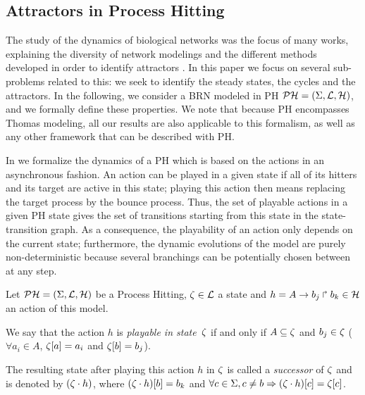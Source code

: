 \subsection{Attractors in Process Hitting}

The study of the dynamics of biological networks was the focus of many works, explaining the diversity of network modelings and the different methods developed in order to identify attractors \cite{skodawessely2011finding, zhang2007algorithms, mushthofa2014asp, akutsu2012finding, berntenis2013detection}.
In this paper we focus on several sub-problems related to this: we seek to identify the steady states, the cycles and the attractors. %
In the following, we consider a BRN modeled in PH $\mathcal{PH}=(\Sigma,\mathcal{L},\mathcal{H})$,
and we formally define these properties.
We note that because PH encompasses Thomas modeling, all our results are also applicable to this formalism, as well as any other framework that can be described with PH.

In  we formalize the dynamics of a PH which is based on the actions in an asynchronous fashion.
An action can be played in a given state if all of its hitters and its target are active in this state; playing this action then means replacing the target process by the bounce process.
Thus, the set of playable actions in a given PH state gives the set of transitions starting from this state in the state-transition graph.
As a consequence, the playability of an action only depends on the current state;
furthermore, the dynamic evolutions of the model are purely non-deterministic
because several branchings can be potentially chosen between at any step.

\begin{definition}
\label{def:playableAction}
Let $\mathcal{PH} = (\Sigma,\mathcal{L},\mathcal{H})$ be a Process Hitting, $\zeta \in \mathcal{L}$ a state and $h = A\rightarrow b_j\Rsh b_k \in \mathcal{H}$ an action of this model.

We say that the action $h$
is \emph{playable in state~$\zeta$} if and only if
$A \subseteq \zeta$ and $b_j \in \zeta$ (\ie $\forall a_i \in A$, ${\zeta[a]} = a_i$ and ${\zeta[b]}=b_j$).

The resulting state after playing this action $h$ in $\zeta$
is called a \emph{successor} of $\zeta$ and
is denoted by $(\zeta \cdot h)$,
where ${(\zeta \cdot h)[b]} = b_k$ and
$\forall c \in \Sigma, c \neq b \Rightarrow {(\zeta\cdot h)[c]}={\zeta[c]}$.
\end{definition}

